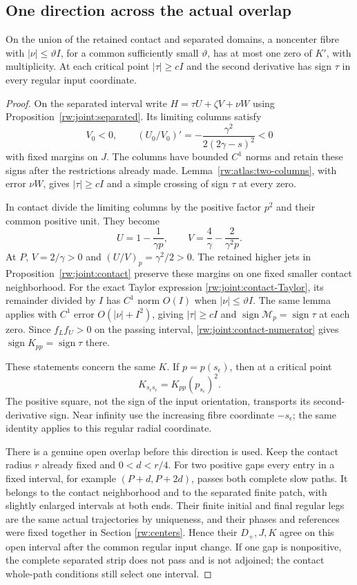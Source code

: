 \subsection{One direction across the actual overlap}

\begin{lemma}\label{rw:joint:one-critical}
On the union of the retained contact and separated domains, a
noncenter fibre with $|\nu|\le\vartheta I$, for a common sufficiently
small $\vartheta$, has at most one zero of $K'$, with multiplicity.
At each critical point $|\tau|\ge cI$ and the second derivative
has sign $\tau$ in every regular input coordinate.
\end{lemma}

\begin{proof}
On the separated interval write
$H=\tau U+\zeta V+\nu W$ using
Proposition~\ref{rw:joint:separated}. Its limiting columns satisfy
\[
 V_0<0,\qquad
 (U_0/V_0)'=-\frac{\gamma^2}{2(2\gamma-s)^2}<0
\]
with fixed margins on $J$. The columns have bounded $C^1$ norms
and retain these signs after the restrictions already made.
Lemma~\ref{rw:atlas:two-columns}, with error $\nu W$, gives
$|\tau|\ge cI$ and a simple crossing of sign $\tau$ at every zero.

In contact divide the limiting columns by the positive factor
$p^2$ and their common positive unit. They become
\[
 U=1-\frac1{\gamma p},\qquad
 V=\frac4\gamma-\frac2{\gamma^2p}.
\]
At $P$, $V=2/\gamma>0$ and $(U/V)_p=\gamma^2/2>0$.
The retained higher jets in
Proposition~\ref{rw:joint:contact} preserve these margins on one
fixed smaller contact neighborhood. For the exact Taylor expression
\eqref{rw:joint:contact-Taylor}, its remainder divided by $I$
has $C^1$ norm $O(I)$ when $|\nu|\le\vartheta I$.
The same lemma applies with $C^1$ error $O(|\nu|+I^2)$, giving
$|\tau|\ge cI$ and $\operatorname{sign}\mathcal M_p=\operatorname{sign}\tau$
at each zero. Since $f_Lf_U>0$ on the passing interval,
\eqref{rw:joint:contact-numerator} gives
$\operatorname{sign}K_{pp}=\operatorname{sign}\tau$ there.

These statements concern the same $K$. If $p=p(s_\epsilon)$,
then at a critical point
\[
 K_{s_\epsilon s_\epsilon}=K_{pp}(p_{s_\epsilon})^2.
\]
The positive square, not the sign of the input orientation,
transports its second-derivative sign. Near infinity use the
increasing fibre coordinate $-s_\epsilon$; the same identity
applies to this regular radial coordinate.

There is a genuine open overlap before this direction is used.
Keep the contact radius $r$ already fixed and $0<d<r/4$.
For two positive gaps every entry in a fixed interval, for example
$(P+d,P+2d)$, passes both complete slow paths. It belongs to
the contact neighborhood and to the separated finite patch, with
slightly enlarged intervals at both ends. Their finite initial and
final regular legs are the same actual trajectories by uniqueness,
and their phases and references were fixed together in Section
\ref{rw:centers}. Hence their $D_+,J,K$ agree on this open
interval after the common regular input change.
If one gap is nonpositive, the complete separated strip does not
pass and is not adjoined; the contact whole-path conditions still
select one interval.


\end{proof}
